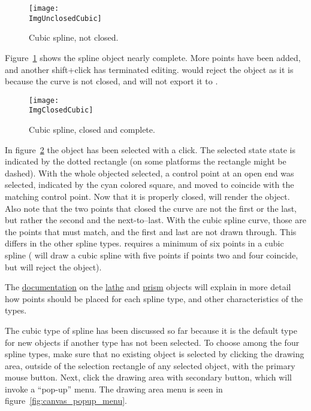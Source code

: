 		\begin{figure}[htbp]
		\centering
		\texttt{[image: \\ImgUnclosedCubic]}
		\caption{Cubic spline, not closed.}
		\label{fig:first_cubic_unclosed}
		\end{figure}

		Figure~\ref{fig:first_cubic_unclosed} shows the spline
		object nearly complete. More points have been added,
		and another shift+click
		has terminated editing. \IXpov{} would reject the object
		as it is because the curve is not closed, and \IXpkg{}
		will not export it to .

		\begin{figure}[htbp]
		\centering
		\texttt{[image: \\ImgClosedCubic]}
		\caption{Cubic spline, closed and complete.}
		\label{fig:first_cubic_closed}
		\end{figure}
		
		In figure~\ref{fig:first_cubic_closed} the object has
		been selected with a click. The selected state state is
		indicated by the dotted rectangle (on some platforms the
		rectangle might be dashed). With the whole objected
		selected, a control point at an open end was selected,
		indicated by the cyan colored square, and moved to coincide
		with the matching control point. Now that it
		is properly closed, \IXpov{} will render the object.
		Also note that the two points that closed the curve are
		not the first or the last, but rather the second and
		the next-to--last. With the cubic spline curve, those
		are the points that must match, and the first and last
		are not drawn through. This differs in the other
		spline types. \IXpov{} requires a minimum of six
		points in a cubic spline (\IXpkg{} will draw a cubic
		spline with five points if points two and four coincide,
		but \IXpov{} will reject the object).
		
		The
		\IXpov{} \href{\URLPOVdocs}{documentation}
		on the
		\href{\URLPOVdocsLathe}{lathe}
		and
		\href{\URLPOVdocsPrism}{prism}
		objects will explain in more detail how points
		should be placed for each spline type, and other
		characteristics of the types.
		
		The cubic type of spline has been discussed so far
		because it is the default type for new objects if another
		type has not been selected. To choose among the four spline
		types, make sure that no existing object is selected by
		clicking the drawing area, outside of the selection
		rectangle of any selected object, with the primary
		mouse button. Next, click the drawing area with secondary
		button, which will invoke a ``pop-up'' menu. The
		drawing area menu is seen in
		figure~\ref{fig:canvas_popup_menu}.

